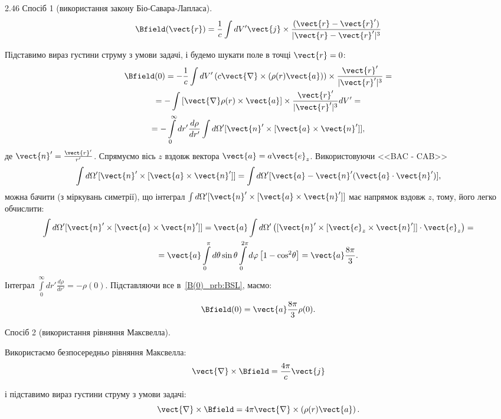 \begin{Solution}{2.{46}}
	Спосіб 1 (використання закону Біо-Савара-Лапласа).
	\[
		\Bfield(\vect{r}) = \frac1c \int dV' \vect{j} \times \frac{(\vect{r} - \vect{r}')}{|\vect{r} - \vect{r}'|^3}
	\]

	Підставимо вираз густини струму з умови задачі, і будемо шукати поле в точці $\vect{r} = 0$:
	\begin{multline}\label{B(0)_prb:BSL}
		\Bfield(0) = -\frac1c \int dV' \left( c\vect{\nabla}\times \left( \rho(r) \vect{a}\right) \right) \times \frac{\vect{r}'}{|\vect{r}'|^3} = \\
		= -\int \left[ \vect{\nabla}\rho(r)\times\vect{a} \right] \times \frac{\vect{r}'}{|\vect{r}'|^3} dV' = \\
		= -\int\limits_0^{\infty} dr'\frac{d\rho}{dr'} \int d\Omega' [{\vect{n}}' \times [{\vect{a}} \times {\vect{n}}']],
	\end{multline}
	де $\vect{n}' = \frac{\vect{r}'}{r'}$. Спрямуємо вісь $z$ вздовж вектора  $\vect{a} = a\vect{e}_z$. Використовуючи <<BAC - CAB>>
	\[
		\int {d\Omega'} [{\vect{n}}' \times [{\vect{a}} \times {\vect{n}}']] = \int {d\Omega'} [\vect{a} - \vect{n}'(\vect{a} \cdot {\vect{n}}')],
	\]
	можна бачити (з міркувань симетрії), що
    інтеграл  $\int {d\Omega'} [{\vect{n}}' \times [{\vect{a}} \times {\vect{n}}']] $ має напрямок вздовж $z$, тому, його легко обчислити:
	\begin{multline}
		\int d\Omega' [{\vect{n}}' \times [{\vect{a}} \times {\vect{n}}']] = {\vect{a}}\int {d\Omega'} \left( {[{\vect{n}}' \times [{{\vect{e}}_z} \times {\vect{n}}']] \cdot {{\vect{e}}_z}} \right) = \\
		= \vect{a}\int\limits_0^\pi  {d\theta } \sin \theta \int\limits_0^{2\pi } {d\varphi } \left[ {1 - {\cos^2}\theta } \right] = \vect{a}\frac{8\pi}{3}.
	\end{multline}
	Інтеграл $\int\limits_0^{\infty} dr'\frac{d\rho}{dr'} = -\rho(0)$.
	Підставляючи все в~\eqref{B(0)_prb:BSL}, маємо:
	\[
		\Bfield(0) = \vect{a}\frac{8\pi}{3}\rho(0).
	\]

	Спосіб 2 (використання рівняння Максвелла).

	Використаємо безпосередньо рівняння Максвелла:
	\[
		\vect{\nabla}\times\Bfield = \frac{4\pi}{c}\vect{j}
	\]

	і підставимо вираз густини струму з умови задачі:
	\[
		\vect{\nabla}\times\Bfield = 4\pi\vect{\nabla}\times \left( \rho(r) \vect{a}\right).
	\]


\end{Solution}
